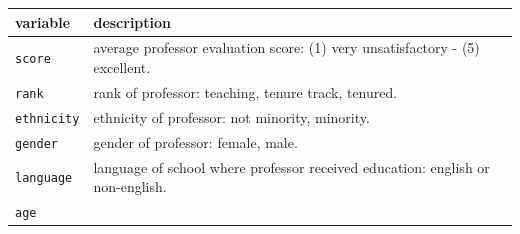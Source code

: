 \documentclass[]{book}
\theoremstyle{definition}
\theoremstyle{definition}
\theoremstyle{remark}
\begin{document}
\begin{longtable}[]{@{}ll@{}}
\toprule
\begin{minipage}[b]{0.22\columnwidth}\raggedright\strut
variable\strut
\end{minipage} & \begin{minipage}[b]{0.16\columnwidth}\raggedright\strut
description\strut
\end{minipage}\tabularnewline
\midrule
\endhead
\begin{minipage}[t]{0.22\columnwidth}\raggedright\strut
\texttt{score}\strut
\end{minipage} & \begin{minipage}[t]{0.16\columnwidth}\raggedright\strut
average professor evaluation score: (1) very unsatisfactory - (5)
excellent.\strut
\end{minipage}\tabularnewline
\begin{minipage}[t]{0.22\columnwidth}\raggedright\strut
\texttt{rank}\strut
\end{minipage} & \begin{minipage}[t]{0.16\columnwidth}\raggedright\strut
rank of professor: teaching, tenure track, tenured.\strut
\end{minipage}\tabularnewline
\begin{minipage}[t]{0.22\columnwidth}\raggedright\strut
\texttt{ethnicity}\strut
\end{minipage} & \begin{minipage}[t]{0.16\columnwidth}\raggedright\strut
ethnicity of professor: not minority, minority.\strut
\end{minipage}\tabularnewline
\begin{minipage}[t]{0.22\columnwidth}\raggedright\strut
\texttt{gender}\strut
\end{minipage} & \begin{minipage}[t]{0.16\columnwidth}\raggedright\strut
gender of professor: female, male.\strut
\end{minipage}\tabularnewline
\begin{minipage}[t]{0.22\columnwidth}\raggedright\strut
\texttt{language}\strut
\end{minipage} & \begin{minipage}[t]{0.16\columnwidth}\raggedright\strut
language of school where professor received education: english or
non-english.\strut
\end{minipage}\tabularnewline
\begin{minipage}[t]{0.22\columnwidth}\raggedright\strut
\texttt{age}\strut
\end{minipage} & \begin{minipage}[t]{0.16\columnwidth}\raggedright\strut

\end{minipage}
\end{longtable}
\end{document}
